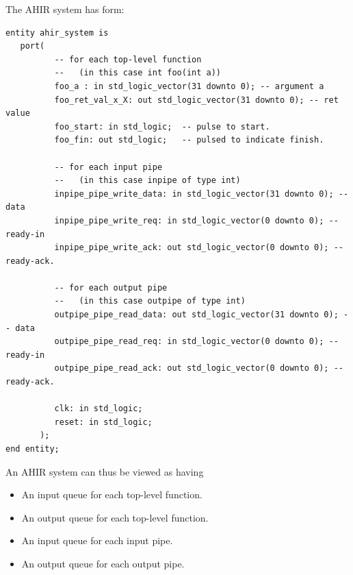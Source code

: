 \documentclass{article}
\begin{document}
The AHIR system has form:
\begin{verbatim}
entity ahir_system is
   port(
          -- for each top-level function 
          --   (in this case int foo(int a))
          foo_a : in std_logic_vector(31 downto 0); -- argument a
          foo_ret_val_x_X: out std_logic_vector(31 downto 0); -- ret value
          foo_start: in std_logic;  -- pulse to start.
          foo_fin: out std_logic;   -- pulsed to indicate finish.
         
          -- for each input pipe
          --   (in this case inpipe of type int)
          inpipe_pipe_write_data: in std_logic_vector(31 downto 0); -- data
          inpipe_pipe_write_req: in std_logic_vector(0 downto 0); -- ready-in
          inpipe_pipe_write_ack: out std_logic_vector(0 downto 0); -- ready-ack.

          -- for each output pipe
          --   (in this case outpipe of type int)
          outpipe_pipe_read_data: out std_logic_vector(31 downto 0); -- data
          outpipe_pipe_read_req: in std_logic_vector(0 downto 0); -- ready-in
          outpipe_pipe_read_ack: out std_logic_vector(0 downto 0); -- ready-ack.

          clk: in std_logic;
          reset: in std_logic;
       );
end entity;
\end{verbatim}
An AHIR system can thus be viewed as having
\begin{itemize}
\item An input queue for each top-level function.
\item An output queue for each top-level function.
\item An input queue for each input pipe.
\item An output queue for each output pipe.
\end{itemize}
\end{document}

